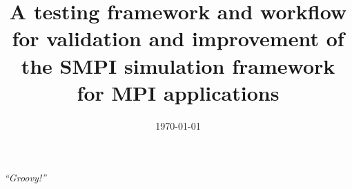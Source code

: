 \documentclass[a4paper, 11pt, oneside]{Thesis}  %
\begin{document}
\frontmatter      %

\title  {A testing framework and workflow for validation and
  improvement of the SMPI simulation framework for MPI applications}
\addresses  {\groupname\\\deptname\\\univname}  %
\date       {\today}
\subject    {}
\keywords   {}

\maketitle


\fancyhead{}  %
\rhead{\thepage}  %
\lhead{}  %

\pagestyle{empty}  %

\null\vfill
\textit{``Groovy!''}

\begin{flushright}
\end{flushright}

\vfill\vfill\vfill\vfill\vfill\vfill\null
\clearpage  %
\end{document}
